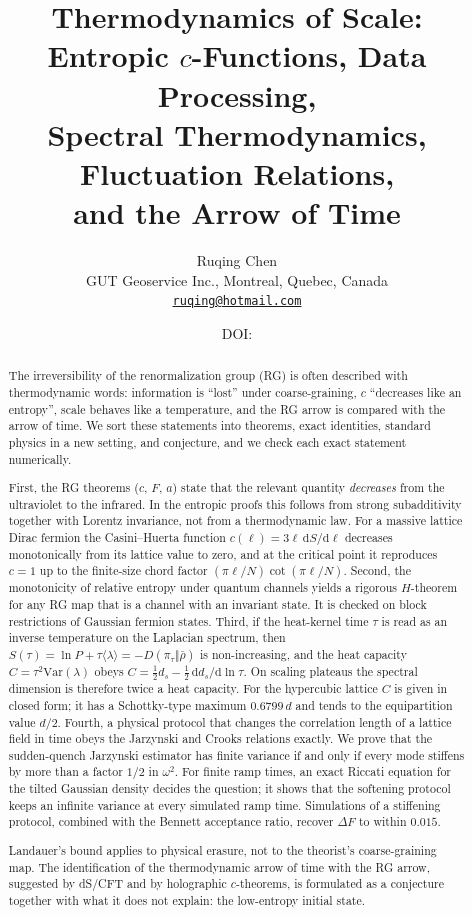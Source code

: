 \documentclass[11pt]{article}
\title{Thermodynamics of Scale:\\
Entropic $c$-Functions, Data Processing,\\ Spectral Thermodynamics, Fluctuation Relations,\\
and the Arrow of Time}
\author{Ruqing Chen\\[2pt]
\small GUT Geoservice Inc., Montreal, Quebec, Canada\\
\small \href{mailto:ruqing@hotmail.com}{\texttt{ruqing@hotmail.com}}}
\date{\small DOI: \href{https://doi.org/\paperdoi}{\paperdoi}}
\theoremstyle{remark}\newtheorem*{remark}{Remark}
\newcommand{\dd}{\mathrm{d}}
\newcommand{\Var}{\mathrm{Var}}
\begin{document}
\maketitle

\begin{abstract}
The irreversibility of the renormalization group (RG) is often described with thermodynamic words: information is
``lost'' under coarse-graining, $c$ ``decreases like an entropy'', scale behaves like a temperature, and the RG
arrow is compared with the arrow of time. We sort these statements into theorems, exact identities, standard
physics in a new setting, and conjecture, and we check each exact statement numerically.

First, the RG theorems ($c$, $F$, $a$) state that the relevant quantity \emph{decreases} from the ultraviolet to the
infrared. In the entropic proofs this follows from strong subadditivity together with Lorentz invariance, not from a
thermodynamic law. For a massive lattice Dirac fermion the Casini--Huerta function $c(\ell)=3\ell\,\dd S/\dd\ell$
decreases monotonically from its lattice value to zero, and at the critical point it reproduces $c=1$ up to the
finite-size chord factor $(\pi\ell/N)\cot(\pi\ell/N)$. Second, the monotonicity of relative entropy under quantum
channels yields a rigorous $H$-theorem for any RG map that is a channel with an invariant state. It is checked
on block restrictions of Gaussian fermion states. Third, if the heat-kernel time $\tau$ is read as an inverse
temperature on the Laplacian spectrum, then $S(\tau)=\ln P+\tau\langle\lambda\rangle=-D(\pi_\tau\Vert\bar\rho)$ is
non-increasing, and the heat capacity $C=\tau^2\Var(\lambda)$ obeys $C=\tfrac12 d_s-\tfrac12\,\dd d_s/\dd\ln\tau$.
On scaling plateaus the spectral dimension is therefore twice a heat capacity. For the hypercubic lattice $C$ is
given in closed form; it has a Schottky-type maximum $0.6799\,d$ and tends to the equipartition value $d/2$.
Fourth, a physical protocol that changes the correlation length of a lattice field in time obeys the Jarzynski and
Crooks relations exactly. We prove that the sudden-quench Jarzynski estimator has finite variance if and only if
every mode stiffens by more than a factor $1/2$ in $\omega^2$. For finite ramp times, an exact Riccati equation
for the tilted Gaussian density decides the question; it shows that the softening protocol keeps an infinite
variance at every simulated ramp time. Simulations of a stiffening protocol, combined with the Bennett acceptance ratio, recover $\Delta F$ to
within $0.015$.

Landauer's bound applies to physical erasure, not to the theorist's coarse-graining map. The identification of the
thermodynamic arrow of time with the RG arrow, suggested by dS/CFT and by holographic $c$-theorems, is formulated
as a conjecture together with what it does not explain: the low-entropy initial state.
\end{abstract}
\end{document}

